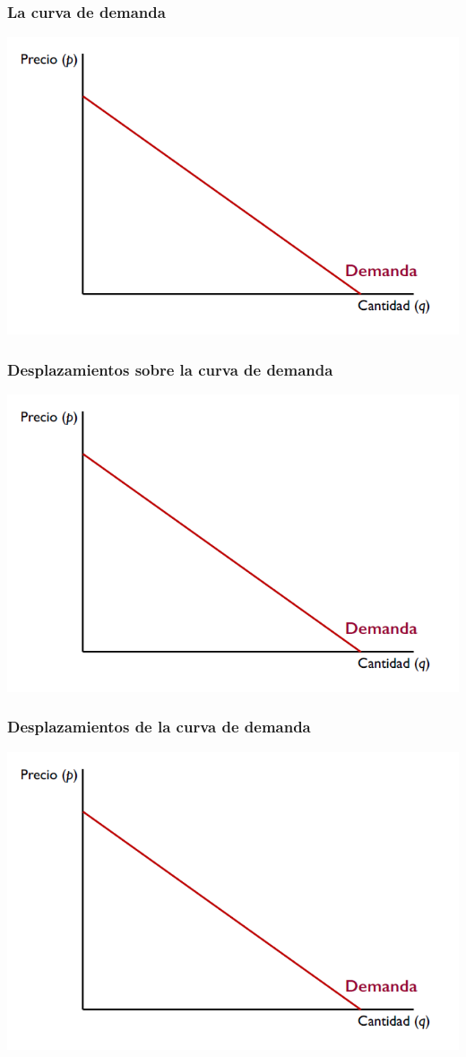 \documentclass{beamer}
\begin{document}
\begin{frame}
\frametitle{La curva de demanda}
\includegraphics[scale=0.6]{Slides Principios de Economia/Figures/Tema_07.1_curvadeldemanda.png}
\end{frame}

\begin{frame}
\frametitle{Desplazamientos sobre la curva de demanda}
\includegraphics[scale=0.6]{Slides Principios de Economia/Figures/Tema_07.1_curvadeldemanda.png}
\end{frame}

\begin{frame}
\frametitle{Desplazamientos de la curva de demanda}
\includegraphics[scale=0.6]{Slides Principios de Economia/Figures/Tema_07.1_curvadeldemanda.png}
\end{frame}
\end{document}

